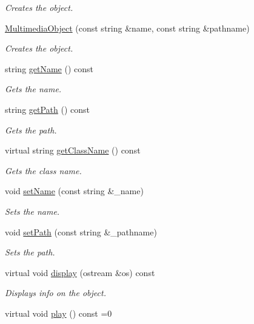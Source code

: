\begin{DoxyCompactItemize}
\begin{DoxyCompactList}\small\item\em Creates the object. \end{DoxyCompactList}\item 
\hyperlink{classMultimediaObject_ac08b63898b63faedcab9f03fa4d44506}{Multimedia\+Object} (const string \&name, const string \&pathname)
\begin{DoxyCompactList}\small\item\em Creates the object. \end{DoxyCompactList}\item 
string \hyperlink{classMultimediaObject_aef20e4a114ff0013ca01b6477bc0282e}{get\+Name} () const 
\begin{DoxyCompactList}\small\item\em Gets the name. \end{DoxyCompactList}\item 
string \hyperlink{classMultimediaObject_a493f2d99c38a0c835a689cf8a0aca0c3}{get\+Path} () const 
\begin{DoxyCompactList}\small\item\em Gets the path. \end{DoxyCompactList}\item 
virtual string \hyperlink{classMultimediaObject_a9eca3c9328fe9141dbdfd571e348aded}{get\+Class\+Name} () const 
\begin{DoxyCompactList}\small\item\em Gets the class name. \end{DoxyCompactList}\item 
void \hyperlink{classMultimediaObject_ad8b8d859412978bd6bbcacedf8f5a2fa}{set\+Name} (const string \&\+\_\+name)
\begin{DoxyCompactList}\small\item\em Sets the name. \end{DoxyCompactList}\item 
void \hyperlink{classMultimediaObject_abf9ff0aa53c66fd18e87bd5d5739e70e}{set\+Path} (const string \&\+\_\+pathname)
\begin{DoxyCompactList}\small\item\em Sets the path. \end{DoxyCompactList}\item 
virtual void \hyperlink{classMultimediaObject_a9249406bc68f3aea92c87744c3f657da}{display} (ostream \&os) const 
\begin{DoxyCompactList}\small\item\em Displays info on the object. \end{DoxyCompactList}\item 
\hypertarget{classMultimediaObject_a4fc54cf0e9fe39e1b885f995f49f9194}{}virtual void \hyperlink{classMultimediaObject_a4fc54cf0e9fe39e1b885f995f49f9194}{play} () const =0\label{classMultimediaObject_a4fc54cf0e9fe39e1b885f995f49f9194}


\end{DoxyCompactItemize}
